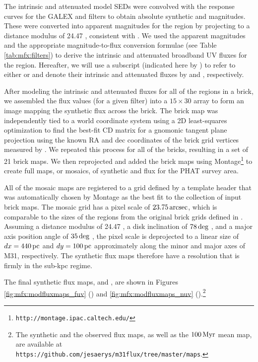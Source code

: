 \documentclass[iop, tighten]{emulateapj}
\begin{document}
The intrinsic and attenuated model SEDs were convolved with the response curves
for the GALEX \fuv{} and \nuv{} filters to obtain absolute synthetic \fuv{} and
\nuv{} magnitudes. These were converted into apparent magnitudes for the region
by projecting to a distance modulus of 24.47 \citep{McConnachie:2005},
consistent with \citet{Lewis:2014}. We used the apparent magnitudes and the
appropriate magnitude-to-flux conversion formulae (see Table
\ref{tab:mfx:filters}) to derive the intrinsic and attenuated broadband UV
fluxes for the region. Hereafter, we will use a subscript (indicated here by
\filter{}) to refer to either \fuv{} or \nuv{} and denote their intrinsic and
attenuated fluxes by \fxsfhz{} and \fxsfh{}, respectively.

After modeling the intrinsic and attenuated fluxes for all of the regions in a
brick, we assembled the flux values (for a given filter) into a $15 \times 30$
array to form an image mapping the synthetic flux across the brick. The brick
map was independently tied to a world coordinate system using a 2D
least-squares optimization to find the best-fit CD matrix
\citep{Calabretta:2002} for a gnomonic tangent plane projection using the known
RA and dec coordinates of the brick grid vertices measured by
\citet{Lewis:2014}. We repeated this process for all of the \citet{Lewis:2014}
bricks, resulting in a set of 21 brick maps. We then reprojected and added the
brick maps using Montage\footnote{\texttt{http://montage.ipac.caltech.edu/}} to
create full maps, or mosaics, of synthetic \fuv{} and \nuv{} flux for the PHAT
survey area.

All of the mosaic maps are registered to a grid defined by a template header
that was automatically chosen by Montage as the best fit to the collection of
input brick maps. The mosaic grid has a pixel scale of $23.75\,\mathrm{arcsec}$, which
is comparable to the sizes of the regions from the original brick grids defined
in \citet{Lewis:2014}. Assuming a distance modulus of 24.47
\citep{McConnachie:2005}, a disk inclination of $78\,\mathrm{deg}$ \citep{Tully:1994},
and a major axis position angle of $35\,\mathrm{deg}$ \citep{deVaucouleurs:1995}, the
pixel scale is deprojected to a linear size of $dx = 440\,\mathrm{pc}$ and $dy = 100\,\mathrm{pc}$
approximately along the minor and major axes of M31, respectively. The
synthetic flux maps therefore have a resolution that is firmly in the sub-kpc
regime.

The final synthetic flux maps, \fxsfhz{} and \fxsfh{}, are shown in Figures
\ref{fig:mfx:modfluxmaps_fuv} (\fuv{}) and \ref{fig:mfx:modfluxmaps_nuv}
(\nuv{}).\footnote{\label{github}The synthetic and the observed flux maps, as
well as the $100\,\mathrm{Myr}$ mean \sfr{} map, are available at
\texttt{https://github.com/jesaerys/m31flux/tree/master/maps}.}
\end{document}
